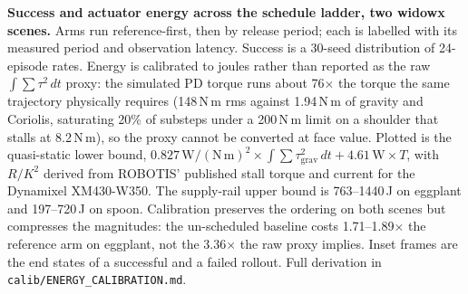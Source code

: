 
\caption{\textbf{Success and actuator energy across the schedule ladder, two
widowx scenes.} Arms run reference-first, then by release period; each is
labelled with its measured period and observation latency. Success is a
30-seed distribution of 24-episode rates. Energy is calibrated to joules rather
than reported as the raw $\int\!\sum\tau^2\,dt$ proxy: the simulated PD torque
runs about 76$\times$ the torque the same trajectory physically requires
(148\,N\,m rms against 1.94\,N\,m of gravity and Coriolis, saturating 20\% of
substeps under a 200\,N\,m limit on a shoulder that stalls at 8.2\,N\,m), so the
proxy cannot be converted at face value. Plotted is the quasi-static lower
bound, $0.827\,\mathrm{W/(N\,m)^2}\times\int\!\sum\tau_{\mathrm{grav}}^2\,dt +
4.61\,\mathrm{W}\times T$, with $R/K^2$ derived from ROBOTIS' published stall
torque and current for the Dynamixel XM430-W350. The supply-rail upper bound is
763--1440\,J on eggplant and 197--720\,J on spoon. Calibration preserves the
ordering on both scenes but compresses the magnitudes: the un-scheduled baseline
costs 1.71--1.89$\times$ the reference arm on eggplant, not the 3.36$\times$ the
raw proxy implies. Inset frames are the end states of a successful and a failed
rollout. Full derivation in \texttt{calib/ENERGY\_CALIBRATION.md}.}
